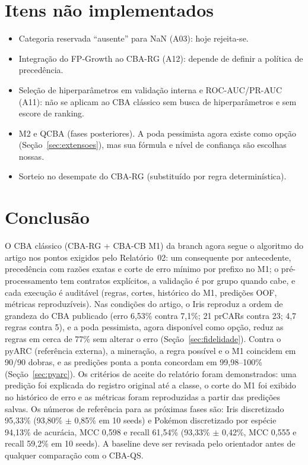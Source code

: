 \documentclass[a4paper,11pt]{article}
\newcommand{\code}[1]{\texttt{\detokenize{#1}}}
\begin{document}
\section{Itens n\~ao implementados}
\begin{itemize}
  \item Categoria reservada ``ausente'' para NaN (A03): hoje rejeita-se.
  \item Integra\c{c}\~ao do FP-Growth ao CBA-RG (A12): depende de definir a pol\'itica de preced\^encia.
  \item Sele\c{c}\~ao de hiperpar\^ametros em valida\c{c}\~ao interna e ROC-AUC/PR-AUC (A11): n\~ao se aplicam ao CBA cl\'assico sem busca de hiperpar\^ametros e sem escore de ranking.
  \item M2 e QCBA (fases posteriores). A poda pessimista agora existe como opção (Seção~\ref{sec:extensoes}), mas sua fórmula e nível de confiança são escolhas nossas.
  \item Sorteio no desempate do CBA-RG (substitu\'ido por regra determin\'istica).
\end{itemize}

\section{Conclus\~ao}
O CBA cl\'assico (CBA-RG + CBA-CB M1) da branch \code{Baseline} agora segue o algoritmo do artigo nos pontos exigidos pelo Relat\'orio~02: um consequente por antecedente, precedência com razões exatas e corte de erro mínimo por prefixo no M1; o pré-processamento tem contratos explícitos, a validação é por grupo quando cabe, e cada execução é auditável (regras, cortes, histórico do M1, predições OOF, métricas reproduzíveis). Nas condi\c{c}\~oes do artigo, o Iris reproduz a ordem de grandeza do CBA publicado (erro 6,53\% contra 7,1\%; 21 prCARs contra 23; 4,7 regras contra 5), e a poda pessimista, agora dispon\'ivel como op\c{c}\~ao, reduz as regras em cerca de 77\% sem alterar o erro (Se\c{c}\~ao~\ref{sec:fidelidade}). Contra o pyARC (refer\^encia externa), a minera\c{c}\~ao, a regra poss\'ivel e o M1 coincidem em 90/90 dobras, e as predi\c{c}\~oes ponta a ponta concordam em 99,98--100\% (Se\c{c}\~ao~\ref{sec:pyarc}). Os crit\'erios de aceite do relat\'orio foram demonstrados: uma predi\c{c}\~ao foi explicada do registro original at\'e a classe, o corte do M1 foi exibido no hist\'orico de erro e as m\'etricas foram reproduzidas a partir das predi\c{c}\~oes salvas. Os n\'umeros de refer\^encia para as pr\'oximas fases s\~ao: Iris discretizado 95,33\% (93,80\% $\pm$ 0,85\% em 10 seeds) e Pok\'emon discretizado por esp\'ecie 94,13\% de acur\'acia, MCC 0,598 e recall 61,54\% (93,33\% $\pm$ 0,42\%, MCC 0,555 e recall 59,2\% em 10 seeds). A baseline deve ser revisada pelo orientador antes de qualquer compara\c{c}\~ao com o CBA-QS.
\end{document}

